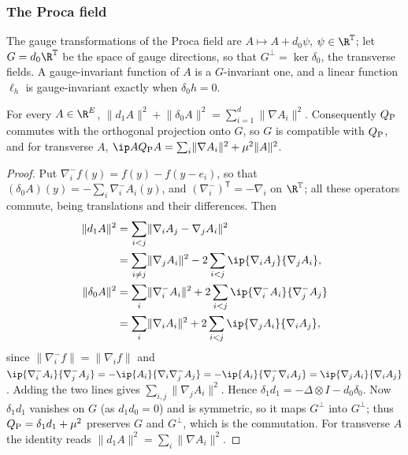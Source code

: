 \subsubsection{The Proca field}

The gauge transformations of the Proca field are $A\mapsto A+d_0\psi$, $\psi
\in\R^{\mathbb T}$; let $G=d_0\R^{\mathbb T}$ be the space of gauge
directions, so that $G^\perp=\ker\delta_0$, the transverse fields. A
gauge-invariant function of $A$ is a $G$-invariant one, and a linear
function $\ell_h$ is gauge-invariant exactly when $\delta_0h=0$.

\begin{lemma}\label{lem:ffhodge}
For every $A\in\R^E$, $\lVert d_1A\rVert^2+\lVert\delta_0A\rVert^2=\sum_{i=1}
^d\lVert\nabla A_i\rVert^2$. Consequently $Q_{\rm P}$ commutes with the
orthogonal projection onto $G$, so $G$ is compatible with $Q_{\rm P}$, and
for transverse $A$, $\ip A{Q_{\rm P}A}=\sum_i\lVert\nabla A_i\rVert^2+\mu^2
\lVert A\rVert^2$.
\end{lemma}

\begin{proof}
Put $\nabla_i^-f(y)=f(y)-f(y-e_i)$, so that $(\delta_0A)(y)=-\sum_i\nabla_i^-
A_i(y)$, and $(\nabla_i^-)^{\mathsf T}=-\nabla_i$ on $\R^{\mathbb T}$; all
these operators commute, being translations and their differences. Then
\begin{align*}
\lVert d_1A\rVert^2&=\sum_{i<j}\lVert\nabla_iA_j-\nabla_jA_i\rVert^2\\
&=\sum_{i\ne j}\lVert\nabla_jA_i\rVert^2-2\sum_{i<j}\ip{\nabla_iA_j}{\nabla_j
A_i},\\
\lVert\delta_0A\rVert^2&=\sum_i\lVert\nabla_i^-A_i\rVert^2+2\sum_{i<j}
\ip{\nabla_i^-A_i}{\nabla_j^-A_j}\\
&=\sum_i\lVert\nabla_iA_i\rVert^2+2\sum_{i<j}\ip{\nabla_jA_i}{\nabla_iA_j},
\end{align*}
since $\lVert\nabla_i^-f\rVert=\lVert\nabla_if\rVert$ and $\ip{\nabla_i^-
A_i}{\nabla_j^-A_j}=-\ip{A_i}{\nabla_i\nabla_j^-A_j}=-\ip{A_i}{\nabla_j^-
\nabla_iA_j}=\ip{\nabla_jA_i}{\nabla_iA_j}$. Adding the two lines gives
$\sum_{i,j}\lVert\nabla_jA_i\rVert^2$. Hence $\delta_1d_1=-\Delta\otimes I-
d_0\delta_0$. Now $\delta_1d_1$ vanishes on $G$ (as $d_1d_0=0$) and is
symmetric, so it maps $G^\perp$ into $G^\perp$; thus $Q_{\rm P}=\delta_1d_1+
\mu^2$ preserves $G$ and $G^\perp$, which is the commutation. For
transverse $A$ the identity reads $\lVert d_1A\rVert^2=\sum_i\lVert\nabla
A_i\rVert^2$.
\end{proof}

